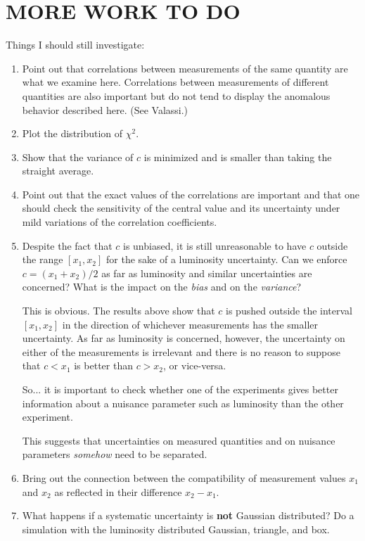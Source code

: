 \documentclass[11pt]{article}
\newcommand{\xa}   {x_1}
\newcommand{\xb}   {x_2}
\begin{document}
\section{MORE WORK TO DO}
\par
Things I should still investigate:
\begin{enumerate}
\item
Point out that correlations between measurements of the same quantity
are what we examine here.   Correlations between measurements of
different quantities are also important but do not tend to display
the anomalous behavior described here.   (See Valassi.)
\item
Plot the distribution of $\chi^2$.
\item
Show that the variance of $c$ is minimized and is smaller
than taking the straight average.
\item
Point out that the exact values of the correlations are important
and that one should check the sensitivity of the central value
and its uncertainty under mild variations of the correlation coefficients.
\item
Despite the fact that $c$ is unbiased, it is still unreasonable to have
$c$ outside the range $[\xa,\xb]$ for the sake of a luminosity uncertainty.
Can we enforce $c = (\xa+\xb)/2$ as far as luminosity and similar uncertainties
are concerned?   What is the impact on the {\sl bias} and on the {\sl variance}?
\par
This is obvious.   The results above show that $c$ is pushed outside the
interval $[\xa,\xb]$ in the direction of whichever measurements has the
smaller uncertainty.   As far as luminosity is concerned, however, the
uncertainty on either of the measurements is irrelevant and there is no
reason to suppose that $c < \xa$ is better than $c > \xb$, or vice-versa.
\par
So...  it is important to check whether one of the experiments gives
better information about a nuisance parameter such as luminosity 
than the other experiment.
\par
This suggests that uncertainties on measured quantities and on nuisance
parameters {\sl somehow} need to be separated.
\item
Bring out the connection between the compatibility of measurement values
$\xa$ and $\xb$ as reflected in their difference $\xb - \xa$.
\item
What happens if a systematic uncertainty is {\bf not} Gaussian distributed?
Do a simulation with the luminosity distributed Gaussian, triangle, and box.

\end{enumerate}
\end{document}

